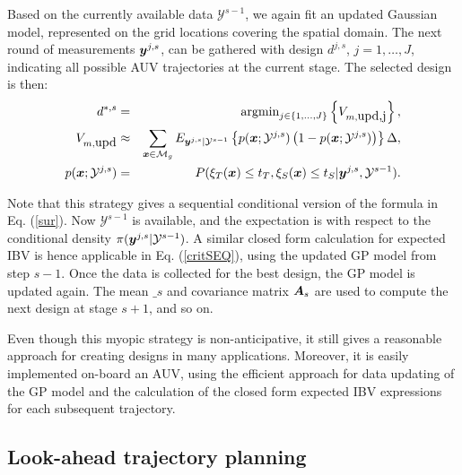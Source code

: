 \documentclass[aoas]{imsart}
\begin{document}
Based on the currently available data $\mathcal{Y}^{s-1}$, we again
fit an updated Gaussian model, represented on the grid locations
covering the spatial domain.  The next round of measurements
${\boldsymbol y}^{j,s}$, can be gathered with design $d^{j,s}$, $j=1,\ldots,J$,
indicating all possible AUV trajectories at the current stage. The
selected design is then:
\begin{eqnarray}\label{critSEQ}
    d^{*,s} &=& \mbox{argmin}_{j \in \{1,\ldots,J\}} \left\{ V_{m,\mbox{upd,j}} \right\},  \\
V_{m,\mbox{upd}} & \approx & \sum_{\bx \in \mathcal{M}_g} E_{\by^{j,s}|\mathcal{Y}^{s-1}} \left\{ p(\bx;\mathcal{Y}^{j,s})\left( 1-p(\bx;\mathcal{Y}^{j,s})\right) \right\} \Delta, \nonumber \\
    p(\bx;\mathcal{Y}^{j,s}) &=& P(\xi_T(\bx) \leq t_T, \xi_S(\bx) \leq t_S |\by^{j,s},\mathcal{Y}^{s-1}). \nonumber
\end{eqnarray}

Note that this strategy gives a sequential conditional version of the
formula in Eq. (\ref{sur}). Now $\mathcal{Y}^{s-1}$ is available, and
the expectation is with respect to the conditional density
$\pi({\boldsymbol y}^{j,s}|\mathcal{Y}^{s-1})$. A similar closed form calculation
for expected IBV is hence applicable in Eq. (\ref{critSEQ}), using the
updated GP model from step $s-1$.  Once the data is collected for the
best design, the GP model is updated again. The mean $\bm_{s}$ and
covariance matrix ${\boldsymbol A}_{s}$ are used to compute the next design at
stage $s+1$, and so on.

Even though this myopic strategy is non-anticipative, it still gives a
reasonable approach for creating designs in many
applications. Moreover, it is easily implemented on-board an AUV,
using the efficient approach for data updating of the GP model and the
calculation of the closed form expected IBV expressions for each
subsequent trajectory.


\subsection{Look-ahead trajectory planning}
\label{LA}
\end{document}
